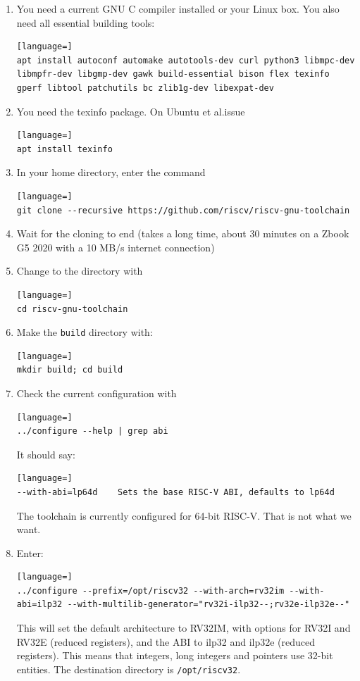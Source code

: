 \documentclass[12pt]{article}
\begin{document}
\begin{enumerate}
\item You need a current GNU C compiler installed or your Linux box. You also need all essential building tools:
\begin{lstlisting}[language=]
apt install autoconf automake autotools-dev curl python3 libmpc-dev libmpfr-dev libgmp-dev gawk build-essential bison flex texinfo gperf libtool patchutils bc zlib1g-dev libexpat-dev
\end{lstlisting}
\item You need the texinfo package. On Ubuntu et al.\@ issue
\begin{lstlisting}[language=]
apt install texinfo
\end{lstlisting}
\item In your home directory, enter the command
\begin{lstlisting}[language=]
git clone --recursive https://github.com/riscv/riscv-gnu-toolchain
\end{lstlisting}
\item Wait for the cloning to end (takes a long time, about 30 minutes on a Zbook G5 2020 with a 10 MB/s internet connection)
\item Change to the directory with
\begin{lstlisting}[language=]
cd riscv-gnu-toolchain
\end{lstlisting}
\item Make the \texttt{build} directory with:
\begin{lstlisting}[language=]
mkdir build; cd build
\end{lstlisting}
\item Check the current configuration with
\begin{lstlisting}[language=]
../configure --help | grep abi
\end{lstlisting}
      It should say:
\begin{lstlisting}[language=]
--with-abi=lp64d    Sets the base RISC-V ABI, defaults to lp64d
\end{lstlisting}
The toolchain is currently configured for 64-bit RISC-V. That is not what we want.
\item Enter:
\begin{lstlisting}[language=]
../configure --prefix=/opt/riscv32 --with-arch=rv32im --with-abi=ilp32 --with-multilib-generator="rv32i-ilp32--;rv32e-ilp32e--"
\end{lstlisting}
This will set the default architecture to RV32IM, with options for RV32I and RV32E (reduced registers), and the ABI to ilp32 and ilp32e (reduced registers). This means that integers, long integers and pointers use 32-bit entities. The destination directory is \lstinline|/opt/riscv32|.


\end{enumerate}
\end{document}
